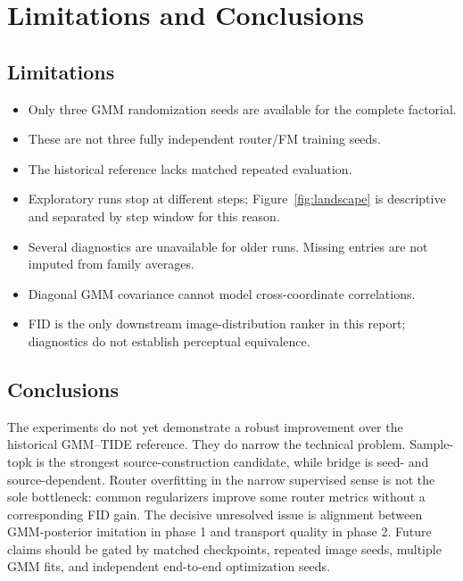 \documentclass[11pt,a4paper]{article}
\begin{document}
\section{Limitations and Conclusions}

\subsection{Limitations}

\begin{itemize}
  \item Only three GMM randomization seeds are available for the complete
  factorial.
  \item These are not three fully independent router/FM training seeds.
  \item The historical reference lacks matched repeated evaluation.
  \item Exploratory runs stop at different steps; Figure~\ref{fig:landscape}
  is descriptive and separated by step window for this reason.
  \item Several diagnostics are unavailable for older runs. Missing entries
  are not imputed from family averages.
  \item Diagonal GMM covariance cannot model cross-coordinate correlations.
  \item FID is the only downstream image-distribution ranker in this report;
  diagnostics do not establish perceptual equivalence.
\end{itemize}

\subsection{Conclusions}

The experiments do not yet demonstrate a robust improvement over the
historical GMM--TIDE reference. They do narrow the technical problem.
Sample-topk is the strongest source-construction candidate, while bridge is
seed- and source-dependent. Router overfitting in the narrow supervised sense
is not the sole bottleneck: common regularizers improve some router metrics
without a corresponding FID gain. The decisive unresolved issue is alignment
between GMM-posterior imitation in phase 1 and transport quality in phase 2.
Future claims should be gated by matched checkpoints, repeated image seeds,
multiple GMM fits, and independent end-to-end optimization seeds.
\end{document}
